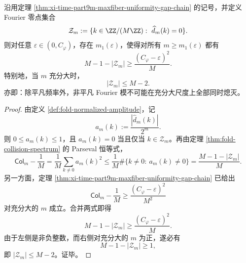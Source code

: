 \begin{corollary}\label{cor:xi-time-part9m-fourier-zero-set-nonsaturation}
沿用定理 \ref{thm:xi-time-part9m-maxfiber-uniformity-gap-chain} 的记号，并定义 Fourier 零点集合
\[
\mathcal Z_m:=\{k\in \ZZ/(M\ZZ):\ \widehat d_m(k)=0\}.
\]
则对任意 \(\varepsilon\in(0,C_\varphi)\)，存在 \(m_1(\varepsilon)\)，使得对所有 \(m\ge m_1(\varepsilon)\) 都有
\[
\boxed{\;
M-1-|\mathcal Z_m|
\ge
\frac{(C_\varphi-\varepsilon)^2}{M}.\;}
\]
特别地，当 \(m\) 充分大时，
\[
\boxed{\;
|\mathcal Z_m|\le M-2.\;}
\]
亦即：除平凡频率外，非平凡 Fourier 模不可能在充分大尺度上全部同时熄灭。
\end{corollary}
\begin{proof}
由定义 \ref{def:fold-normalized-amplitude}，记
\[
a_m(k):=\frac{|\widehat d_m(k)|}{2^m}.
\]
则 \(0\le a_m(k)\le 1\)，且 \(a_m(k)=0\) 当且仅当 \(k\in\mathcal Z_m\)。再由定理 \ref{thm:fold-collision-spectrum} 的 Parseval 恒等式，
\[
\mathsf{Col}_m-\frac{1}{M}
=
\frac{1}{M}\sum_{k\ne 0}a_m(k)^2
\le
\frac{1}{M}\#\{k\ne 0:\ a_m(k)\ne 0\}
=
\frac{M-1-|\mathcal Z_m|}{M}.
\]
另一方面，定理 \ref{thm:xi-time-part9m-maxfiber-uniformity-gap-chain} 已给出
\[
\mathsf{Col}_m-\frac{1}{M}
\ge
\frac{(C_\varphi-\varepsilon)^2}{M^2}
\]
对充分大的 \(m\) 成立。合并两式即得
\[
M-1-|\mathcal Z_m|
\ge
\frac{(C_\varphi-\varepsilon)^2}{M}.
\]
由于左侧是非负整数，而右侧对充分大的 \(m\) 为正，遂必有
\[
M-1-|\mathcal Z_m|\ge 1,
\]
即 \(|\mathcal Z_m|\le M-2\)。证毕。
\end{proof}

